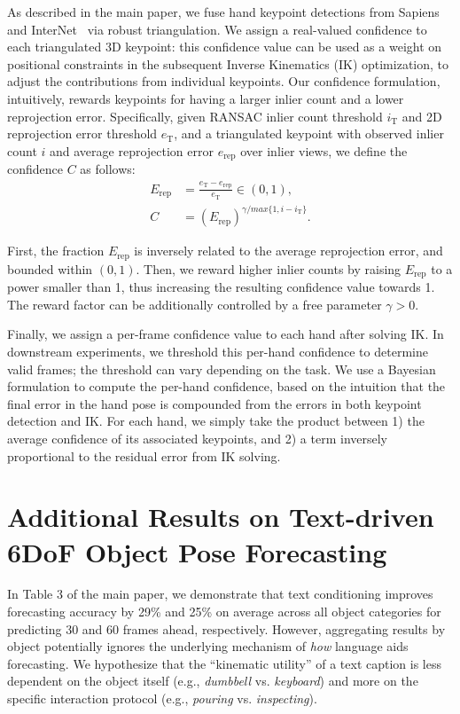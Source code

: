 \documentclass[10pt,twocolumn,letterpaper]{article}
\begin{document}
As described in the main paper, we fuse hand keypoint detections from Sapiens and InterNet~\cite{Moon_2020_ECCV_InterHand2.6M} via robust triangulation.
We assign  a real-valued confidence to each triangulated 3D keypoint: this confidence value can be used as  a weight on positional constraints in the subsequent Inverse Kinematics (IK) optimization, to adjust the contributions from individual keypoints.
Our confidence formulation, intuitively, rewards keypoints for having a larger inlier count and a lower reprojection error.
Specifically, given RANSAC inlier count threshold $i_\textrm{T}$ and 2D reprojection error threshold $e_\textrm{T}$, and a triangulated keypoint with observed inlier count $i$ and average reprojection error $e_\textrm{rep}$ over inlier views,
we define the confidence $C$ as follows:
\begin{align}
E_\textrm{rep} & = \frac{e_\textrm{T}-e_{\textrm{rep}}}{e_\textrm{T}}\in (0,1),\\
 C  & = \left(E_{\textrm{rep}}\right) ^{{\gamma}/{max\{1,i-i_\textrm{T}\}}}.
\end{align}

First, the fraction $E_\textrm{rep}$ is inversely related to the average reprojection error, and bounded within $(0,1)$.
Then, we reward higher inlier counts by raising $E_\textrm{rep}$ to a power smaller than 1, thus increasing the resulting confidence value towards 1.
The reward factor can be additionally controlled by a free parameter $\gamma>0$.

Finally, we assign a per-frame confidence value to each hand after solving IK. 
In downstream experiments, we threshold this per-hand confidence to determine valid frames; the threshold can vary depending on the task.
We use a Bayesian formulation to compute the per-hand confidence, based on the intuition that the final error in the hand pose is compounded from the errors in both keypoint detection and IK.
For each  hand, we simply take the product between 1) the average confidence of its associated keypoints, and 2) a term inversely proportional to the residual error from IK solving.


\section{Additional Results on Text-driven\\6DoF Object Pose Forecasting}

In Table 3 of the main paper, we demonstrate that text conditioning improves forecasting accuracy by 29\% and 25\% on average across all object categories for predicting 30 and 60 frames ahead, respectively. However, aggregating results by object potentially ignores the underlying mechanism of \emph{how} language aids forecasting. We hypothesize that the ``kinematic utility'' of a text caption is less dependent on the object itself (e.g., \emph{dumbbell} vs. \emph{keyboard}) and more on the specific interaction protocol (e.g., \emph{pouring} vs. \emph{inspecting}).
\end{document}
